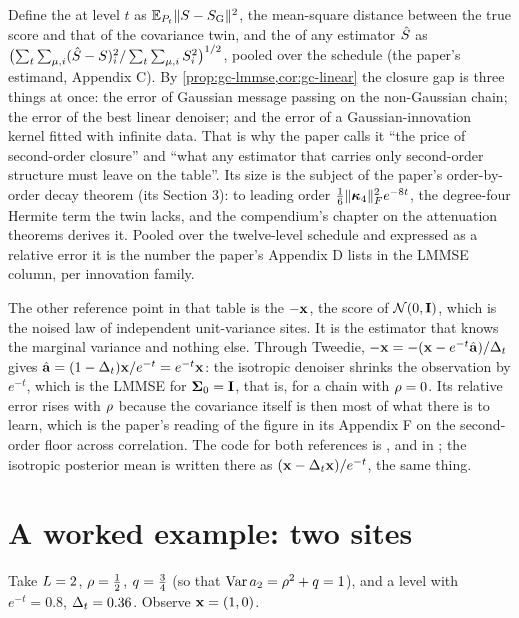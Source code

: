 Define the  at level $t$ as $\mathbb{E}_{P_t}\lVert S-S_{\mathrm{G}}\rVert^2$, the
mean-square distance between the true score and that of the covariance twin, and the
 of any estimator $\hat{S}$ as
$\bigl(\sum_t\sum_{\mu,i}(\hat{S}-S)_i^2/\sum_t\sum_{\mu,i}S_i^2\bigr)^{1/2}$,
pooled over the schedule (the paper's estimand, Appendix C). By
\cref{prop:gc-lmmse,cor:gc-linear} the closure gap is three things at once: the error of
Gaussian message passing on the non-Gaussian chain; the error of the best linear
denoiser; and the error of a Gaussian-innovation kernel fitted with infinite data. That
is why the paper calls it ``the price of second-order closure'' and ``what any estimator
that carries only second-order structure must leave on the table''. Its size is the
subject of the paper's order-by-order decay theorem (its Section 3): to leading order $\tfrac16\lVert \bm{\kappa}_4 \rVert_{F}^2e^{-8t}$,
the degree-four Hermite term the twin lacks, and the compendium's chapter on the
attenuation theorems derives it. Pooled over the twelve-level schedule and expressed
as a relative error it is the number the paper's Appendix D lists in the LMMSE column,
per innovation family.

The other reference point in that table is the  $-\mathbf{x}$, the
score of $\mathcal{N}\!\left(0,\mathbf{I}\right)$, which is the noised law of independent unit-variance sites.
It is the estimator that knows the marginal variance and nothing else. Through Tweedie,
$-\mathbf{x}=-(\mathbf{x}-e^{-t}\hat{\mathbf{a}})/\Delta_t$ gives $\hat{\mathbf{a}}=(1-\Delta_t)\mathbf{x}/e^{-t}=e^{-t}\mathbf{x}$: the isotropic
denoiser shrinks the observation by $e^{-t}$, which is the LMMSE for $\mathbf{\Sigma}_0=\mathbf{I}$, that
is, for a chain with $\rho=0$. Its relative error rises with $\rho$ because the
covariance itself is then most of what there is to learn, which is the paper's reading
of the figure in its Appendix F on the second-order floor across correlation. The
code for both references is ,
 and  in ;
the isotropic posterior mean is written there as $(\mathbf{x}-\Delta_t\mathbf{x})/e^{-t}$, the same thing.

\section{A worked example: two sites}

Take $L=2$, $\rho=\tfrac12$, $q=\tfrac34$ (so that $\operatorname{Var} a_2=\rho^2+q=1$),
and a level with $e^{-t}=0.8$, $\Delta_t=0.36$. Observe $\mathbf{x}=(1,0)$.

